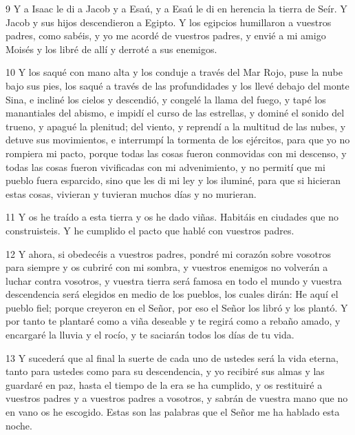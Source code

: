 \par 9 Y a Isaac le di a Jacob y a Esaú, y a Esaú le di en herencia la tierra de Seír. Y Jacob y sus hijos descendieron a Egipto. Y los egipcios humillaron a vuestros padres, como sabéis, y yo me acordé de vuestros padres, y envié a mi amigo Moisés y los libré de allí y derroté a sus enemigos.

\par 10 Y los saqué con mano alta y los conduje a través del Mar Rojo, puse la nube bajo sus pies, los saqué a través de las profundidades y los llevé debajo del monte Sina, e incliné los cielos y descendió, y congelé la llama del fuego, y tapé los manantiales del abismo, e impidí el curso de las estrellas, y dominé el sonido del trueno, y apagué la plenitud; del viento, y reprendí a la multitud de las nubes, y detuve sus movimientos, e interrumpí la tormenta de los ejércitos, para que yo no rompiera mi pacto, porque todas las cosas fueron conmovidas con mi descenso, y todas las cosas fueron vivificadas con mi advenimiento, y no permití que mi pueblo fuera esparcido, sino que les di mi ley y los iluminé, para que si hicieran estas cosas, vivieran y tuvieran muchos días y no murieran.

\par 11 Y os he traído a esta tierra y os he dado viñas. Habitáis en ciudades que no construisteis. Y he cumplido el pacto que hablé con vuestros padres.

\par 12 Y ahora, si obedecéis a vuestros padres, pondré mi corazón sobre vosotros para siempre y os cubriré con mi sombra, y vuestros enemigos no volverán a luchar contra vosotros, y vuestra tierra será famosa en todo el mundo y vuestra descendencia será elegidos en medio de los pueblos, los cuales dirán: He aquí el pueblo fiel; porque creyeron en el Señor, por eso el Señor los libró y los plantó. Y por tanto te plantaré como a viña deseable y te regirá como a rebaño amado, y encargaré la lluvia y el rocío, y te saciarán todos los días de tu vida.

\par 13 Y sucederá que al final la suerte de cada uno de ustedes será la vida eterna, tanto para ustedes como para su descendencia, y yo recibiré sus almas y las guardaré en paz, hasta el tiempo de la era se ha cumplido, y os restituiré a vuestros padres y a vuestros padres a vosotros, y sabrán de vuestra mano que no en vano os he escogido. Estas son las palabras que el Señor me ha hablado esta noche.

